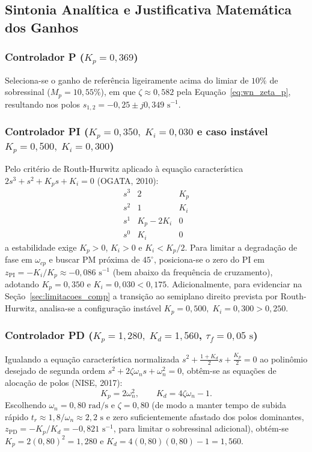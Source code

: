 \subsection{Sintonia Analítica e Justificativa Matemática dos Ganhos}\label{sec:sintonia}

\subsubsection{Controlador P ($K_p = 0{,}369$)}
Seleciona-se o ganho de referência ligeiramente acima do limiar de $10\%$ de sobressinal ($M_p = 10{,}55\%$), em que $\zeta \approx 0{,}582$ pela Equação~\eqref{eq:wn_zeta_p}, resultando nos polos $s_{1,2} = -0{,}25 \pm j0{,}349\text{ s}^{-1}$.

\subsubsection[Controlador PI (caso estável e caso instável)]{Controlador PI ($K_p = 0{,}350,\; K_i = 0{,}030$ e caso instável $K_p = 0{,}500,\; K_i = 0{,}300$)}
Pelo critério de Routh-Hurwitz aplicado à equação característica $2s^3 + s^2 + K_p s + K_i = 0$ (OGATA, 2010):
\[
\begin{array}{c|cc}
    s^3 & 2 & K_p \\
    s^2 & 1 & K_i \\
    s^1 & K_p - 2K_i & 0 \\
    s^0 & K_i & 0
\end{array}
\]
a estabilidade exige $K_p > 0$, $K_i > 0$ e $K_i < K_p / 2$. Para limitar a degradação de fase em $\omega_{cp}$ e buscar $\mathrm{PM}$ próxima de $45^\circ$, posiciona-se o zero do PI em $z_{\text{PI}} = -K_i/K_p \approx -0{,}086\text{ s}^{-1}$ (bem abaixo da frequência de cruzamento), adotando $K_p = 0{,}350$ e $K_i = 0{,}030 < 0{,}175$. Adicionalmente, para evidenciar na Seção~\ref{sec:limitacoes_comp} a transição ao semiplano direito prevista por Routh-Hurwitz, analisa-se a configuração instável $K_p = 0{,}500,\; K_i = 0{,}300 > 0{,}250$.

\subsubsection[Controlador PD ($K_p = 1{,}280,\; K_d = 1{,}560$)]{Controlador PD ($K_p = 1{,}280,\; K_d = 1{,}560$, $\tau_f = 0{,}05\text{ s}$)}
Igualando a equação característica normalizada $s^2 + \frac{1+K_d}{2}s + \frac{K_p}{2} = 0$ ao polinômio desejado de segunda ordem $s^2 + 2\zeta\omega_n s + \omega_n^2 = 0$, obtêm-se as equações de alocação de polos (NISE, 2017):
\begin{equation}
    K_p = 2\omega_n^2, \qquad K_d = 4\zeta\omega_n - 1.
\end{equation}
Escolhendo $\omega_n = 0{,}80\text{ rad/s}$ e $\zeta = 0{,}80$ (de modo a manter tempo de subida rápido $t_r \approx 1{,}8/\omega_n \approx 2{,}2\text{ s}$ e zero suficientemente afastado dos polos dominantes, $z_{\text{PD}} = -K_p/K_d = -0{,}821\text{ s}^{-1}$, para limitar o sobressinal adicional), obtém-se $K_p = 2(0{,}80)^2 = 1{,}280$ e $K_d = 4(0{,}80)(0{,}80) - 1 = 1{,}560$.

